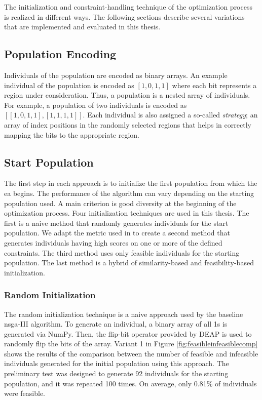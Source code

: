 The initialization and constraint-handling technique of the optimization process is realized in different ways. The following sections describe several variations that are implemented and evaluated in this thesis.

\subsection{Population Encoding}
Individuals of the population are encoded as binary arrays. An example individual of the population is encoded as $[1, 0, 1, 1]$ where each bit represents a region under consideration. Thus, a population is a nested array of individuals. For example, a population of two individuals is encoded as $[[1, 0, 1, 1], [1,1,1, 1]]$. Each individual is also assigned a so-called \textit{strategy}; an array of index positions in the randomly selected regions that helps in correctly mapping the bits to the appropriate region.

\subsection{Start Population}
The first step in each approach is to initialize the first population from which the \gls{ea} begins. The performance of the algorithm can vary depending on the starting population used. A main criterion is good diversity at the beginning of the optimization process. Four initialization techniques are used in this thesis. The first is a naive method that randomly generates individuals for the start population. We adapt the metric used in \parencite{cbrecsys2014} to create a second method that generates individuals having high scores on one or more of the defined constraints. The third method uses only feasible individuals for the starting population. The last method is a hybrid of similarity-based and feasibility-based initialization.

\subsubsection{Random Initialization}\label{sec_randominit}
The random initialization technique is a naive approach used by the baseline \gls{nsga}-III algorithm. To generate an individual, a binary array of all 1s is generated via NumPy. Then, the flip-bit operator provided by \gls{DEAP} is used to randomly flip the bits of the array. Variant 1 in Figure \ref{fig:feasibleinfeasiblecomp} shows the results of the comparison between the number of feasible and infeasible individuals generated for the initial population using this approach. The preliminary test was designed to generate 92 individuals for the starting population, and it was repeated 100 times. On average, only 0.81\% of individuals were feasible. 

